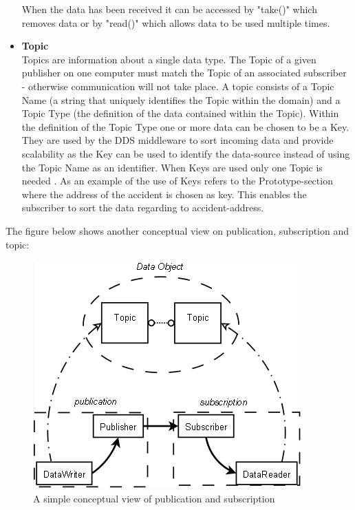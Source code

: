 \documentclass[Main]{subfiles}
\begin{document}
\begin{itemize}
\begin{itemize}
  \end{itemize}
  When the data has been received it can be accessed by "take()" which removes data or by "read()" which allows data to be used multiple times.
  \item \textbf{Topic}\\Topics are information about a single data type. The Topic of a given publisher on one computer must match the Topic of an associated subscriber - otherwise communication will not take place. A topic consists of a Topic Name (a string that uniquely identifies the Topic within the domain) and a Topic Type (the definition of the data contained within the Topic). Within the definition of the Topic Type one or more data can be chosen to be a Key. They are used by the DDS middleware to sort incoming data and provide scalability as the Key can be used to identify the data-source instead of using the Topic Name as an identifier. When Keys are used only one Topic is needed \cite{RTI} \cite{opendds} \cite{DDS-slides}. As an example of the use of Keys refers to the Prototype-section where the address of the accident is chosen as key. This enables the subscriber to sort the data regarding to accident-address.
\end{itemize}

The figure below shows another conceptual view on publication, subscription and topic: 

\begin{figure}[H]
\centering
\includegraphics[scale=0.7]{Figure/PublicationAndSubscription.png}
\caption{A simple conceptual view of publication and subscription \cite{ddsopen}}
\end{figure}
\end{document}
